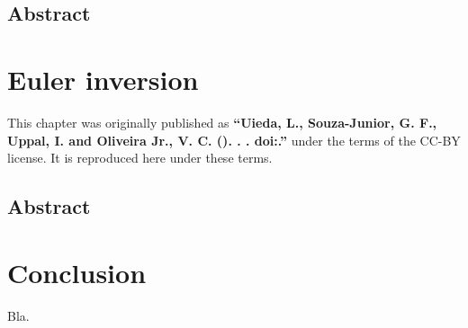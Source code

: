 \documentclass[10pt,a4paper,oneside]{book}
\begin{document}
\section*{Abstract}


% 
\endgroup

\chapter{Euler inversion}

\begingroup



\begin{summarybox}
    \noindent
    This chapter was originally published as
    \textbf{``Uieda, L., Souza-Junior, G. F., Uppal, I. and Oliveira Jr., V. C.
    (\Year). \Title{}. \textit{\Journal{}}.
    doi:\href{https://doi.org/\JournalDOI}{\JournalDOI}.''} under the
    terms of the CC-BY license. It is reproduced here under these terms.
\end{summarybox}

\section*{Abstract}


% 
\endgroup

\chapter{Conclusion}

Bla.




\end{document}
